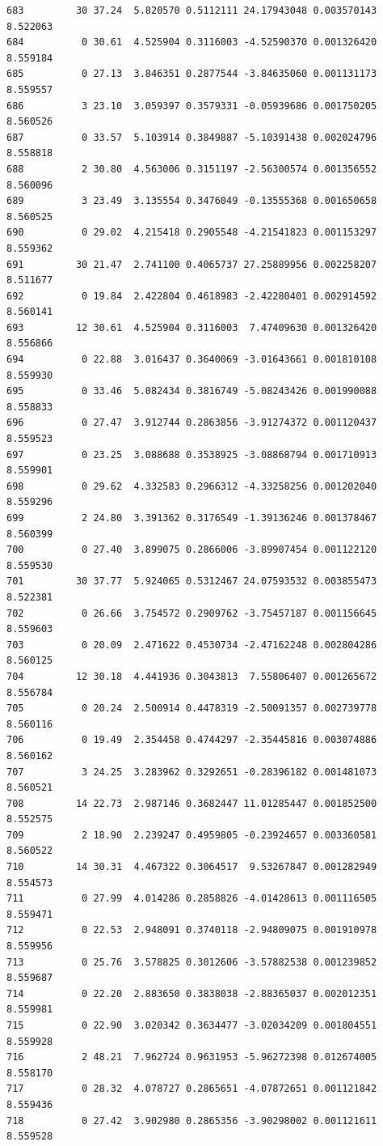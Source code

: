 \documentclass[]{book}
\theoremstyle{definition}
\theoremstyle{definition}
\theoremstyle{definition}
\theoremstyle{remark}
\begin{document}
\begin{verbatim}
683         30 37.24  5.820570 0.5112111 24.17943048 0.003570143 8.522063
684          0 30.61  4.525904 0.3116003 -4.52590370 0.001326420 8.559184
685          0 27.13  3.846351 0.2877544 -3.84635060 0.001131173 8.559557
686          3 23.10  3.059397 0.3579331 -0.05939686 0.001750205 8.560526
687          0 33.57  5.103914 0.3849887 -5.10391438 0.002024796 8.558818
688          2 30.80  4.563006 0.3151197 -2.56300574 0.001356552 8.560096
689          3 23.49  3.135554 0.3476049 -0.13555368 0.001650658 8.560525
690          0 29.02  4.215418 0.2905548 -4.21541823 0.001153297 8.559362
691         30 21.47  2.741100 0.4065737 27.25889956 0.002258207 8.511677
692          0 19.84  2.422804 0.4618983 -2.42280401 0.002914592 8.560141
693         12 30.61  4.525904 0.3116003  7.47409630 0.001326420 8.556866
694          0 22.88  3.016437 0.3640069 -3.01643661 0.001810108 8.559930
695          0 33.46  5.082434 0.3816749 -5.08243426 0.001990088 8.558833
696          0 27.47  3.912744 0.2863856 -3.91274372 0.001120437 8.559523
697          0 23.25  3.088688 0.3538925 -3.08868794 0.001710913 8.559901
698          0 29.62  4.332583 0.2966312 -4.33258256 0.001202040 8.559296
699          2 24.80  3.391362 0.3176549 -1.39136246 0.001378467 8.560399
700          0 27.40  3.899075 0.2866006 -3.89907454 0.001122120 8.559530
701         30 37.77  5.924065 0.5312467 24.07593532 0.003855473 8.522381
702          0 26.66  3.754572 0.2909762 -3.75457187 0.001156645 8.559603
703          0 20.09  2.471622 0.4530734 -2.47162248 0.002804286 8.560125
704         12 30.18  4.441936 0.3043813  7.55806407 0.001265672 8.556784
705          0 20.24  2.500914 0.4478319 -2.50091357 0.002739778 8.560116
706          0 19.49  2.354458 0.4744297 -2.35445816 0.003074886 8.560162
707          3 24.25  3.283962 0.3292651 -0.28396182 0.001481073 8.560521
708         14 22.73  2.987146 0.3682447 11.01285447 0.001852500 8.552575
709          2 18.90  2.239247 0.4959805 -0.23924657 0.003360581 8.560522
710         14 30.31  4.467322 0.3064517  9.53267847 0.001282949 8.554573
711          0 27.99  4.014286 0.2858826 -4.01428613 0.001116505 8.559471
712          0 22.53  2.948091 0.3740118 -2.94809075 0.001910978 8.559956
713          0 25.76  3.578825 0.3012606 -3.57882538 0.001239852 8.559687
714          0 22.20  2.883650 0.3838038 -2.88365037 0.002012351 8.559981
715          0 22.90  3.020342 0.3634477 -3.02034209 0.001804551 8.559928
716          2 48.21  7.962724 0.9631953 -5.96272398 0.012674005 8.558170
717          0 28.32  4.078727 0.2865651 -4.07872651 0.001121842 8.559436
718          0 27.42  3.902980 0.2865356 -3.90298002 0.001121611 8.559528

\end{verbatim}
\end{document}
